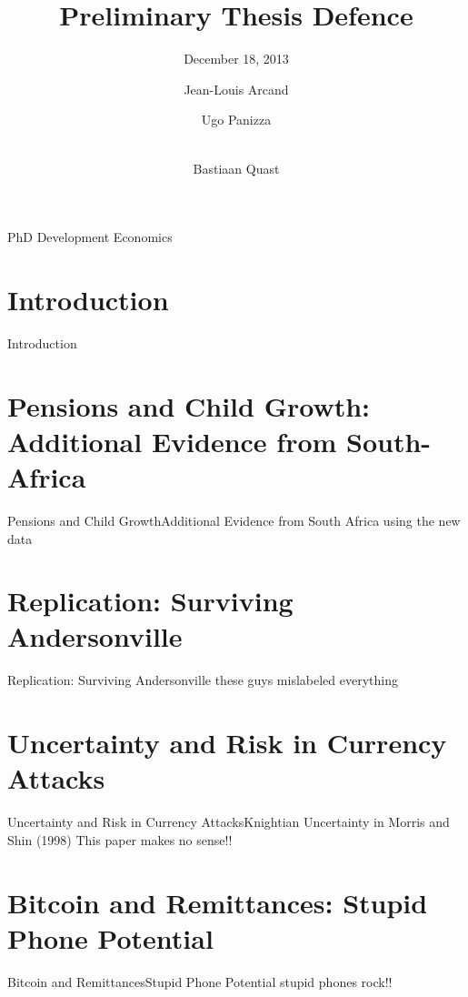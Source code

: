 \documentclass{beamer}
\title[]{Preliminary Thesis Defence}
\subtitle{December 18, 2013}
\author[Bastiaan Quast]{
  Jean-Louis Arcand\inst{1,4}
    \and
  Ugo Panizza\inst{2,4}
    \and
  \\Bastiaan Quast\inst{3,4}
  }
\institute[The Graduate Institute, Geneva] %
{
  \inst{1}
  Professor of Economics,\\
  Supervisor
    \and
  \inst{2}
  Professor of Economics,\\
  Second Reader
    \and
  \inst{3}
  PhD Student,\\
  bastiaan.quast@graduateinstitute.ch
    \and
  \inst{4}
  The Graduate Institute, Geneva
}
\date[18-12-2013]%
\begin{document}
\begin{frame}{PhD Development Economics}
  \titlepage
\end{frame}

\section{Introduction}

\begin{frame}{Introduction}
  \tableofcontents
\end{frame}

\section[Pensions, Child Growth]{Pensions and Child Growth: Additional Evidence from South-Africa}

\begin{frame}{Pensions and Child Growth}{Additional Evidence from South Africa}
using the new data
\end{frame}

\section[Surviving Andersonville]{Replication: Surviving Andersonville}

\begin{frame}{Replication: Surviving Andersonville}
these guys mislabeled everything
\end{frame}

\section[Uncertainty, Currency Attacks]{Uncertainty and Risk in Currency Attacks}

\begin{frame}{Uncertainty and Risk in Currency Attacks}{Knightian Uncertainty in Morris and Shin (1998)}
This paper makes no sense!!
\end{frame}

\section[Bitcoin, Stupid Phones]{Bitcoin and Remittances: Stupid Phone Potential}

\begin{frame}{Bitcoin and Remittances}{Stupid Phone Potential}
stupid phones rock!!
\end{frame}
\end{document}

